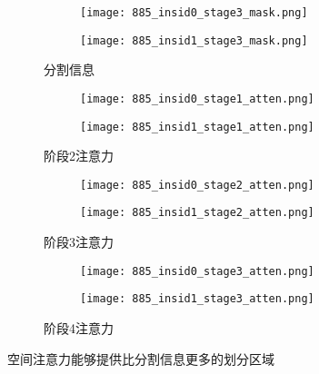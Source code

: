 \begin{figure}[h]
	\centering
	\begin{subfigure}{0.23\textwidth}
		\centering
		\begin{subfigure}[b]{\linewidth}
			\texttt{[image: 885\_insid0\_stage3\_mask.png]}
		\end{subfigure}
		\vskip2pt
		\begin{subfigure}[b]{\linewidth}
			\texttt{[image: 885\_insid1\_stage3\_mask.png]}
		\end{subfigure}
		\caption{分割信息}
	\end{subfigure}
	\begin{subfigure}{0.23\textwidth}
		\begin{subfigure}[b]{\linewidth}
			\texttt{[image: 885\_insid0\_stage1\_atten.png]}
		\end{subfigure}
		\vskip2pt
		\begin{subfigure}[b]{\linewidth}
			\texttt{[image: 885\_insid1\_stage1\_atten.png]}
		\end{subfigure}
		\caption{阶段2注意力}
	\end{subfigure}
	\begin{subfigure}{0.23\textwidth}
		\begin{subfigure}[b]{\linewidth}
			\texttt{[image: 885\_insid0\_stage2\_atten.png]}
		\end{subfigure}
		\vskip2pt
		\begin{subfigure}[b]{\linewidth}
			\texttt{[image: 885\_insid1\_stage2\_atten.png]}
		\end{subfigure}
		\caption{阶段3注意力}
	\end{subfigure}
	\begin{subfigure}{0.23\linewidth}
		\centering
		\begin{subfigure}[b]{\linewidth}
			\texttt{[image: 885\_insid0\_stage3\_atten.png]}
		\end{subfigure}
		\vskip2pt
		\begin{subfigure}[b]{\linewidth}
			\texttt{[image: 885\_insid1\_stage3\_atten.png]}
		\end{subfigure}
		\caption{阶段4注意力}
	\end{subfigure}
	\begin{minipage}{0.05\linewidth}
		
		\vskip1cm
	\end{minipage}
	\caption{空间注意力能够提供比分割信息更多的划分区域}
	\label{fig:attention_mask}
\end{figure}

